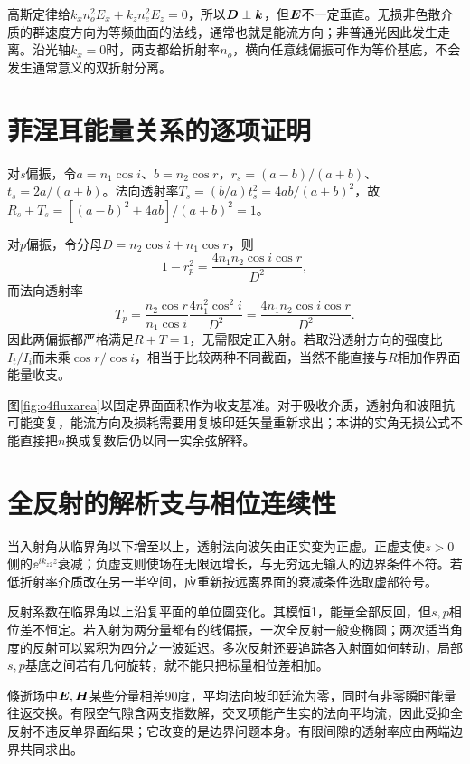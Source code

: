 高斯定律给$k_xn_o^2E_x+k_zn_e^2E_z=0$，所以$\bm{D}\perp\bm{k}$，但$\bm{E}$不一定垂直。无损非色散介质的群速度方向为等频曲面的法线，通常也就是能流方向；非普通光因此发生走离。沿光轴$k_x=0$时，两支都给折射率$n_o$，横向任意线偏振可作为等价基底，不会发生通常意义的双折射分离。

\section{菲涅耳能量关系的逐项证明}
对$s$偏振，令$a=n_1\cos i$、$b=n_2\cos r$，$r_s=(a-b)/(a+b)$、$t_s=2a/(a+b)$。法向透射率$T_s=(b/a)t_s^2=4ab/(a+b)^2$，故$R_s+T_s=[(a-b)^2+4ab]/(a+b)^2=1$。

对$p$偏振，令分母$D=n_2\cos i+n_1\cos r$，则
\[
 1-r_p^2=\frac{4n_1n_2\cos i\cos r}{D^2},
\]
而法向透射率
\[
 T_p=\frac{n_2\cos r}{n_1\cos i}
 \frac{4n_1^2\cos^2i}{D^2}
 =\frac{4n_1n_2\cos i\cos r}{D^2}.
\]
因此两偏振都严格满足$R+T=1$，无需限定正入射。若取沿透射方向的强度比$I_t/I_i$而未乘$\cos r/\cos i$，相当于比较两种不同截面，当然不能直接与$R$相加作界面能量收支。

图\ref{fig:o4fluxarea}以固定界面面积作为收支基准。对于吸收介质，透射角和波阻抗可能变复，能流方向及损耗需要用复坡印廷矢量重新求出；本讲的实角无损公式不能直接把$n$换成复数后仍以同一实余弦解释。

\section{全反射的解析支与相位连续性}
当入射角从临界角以下增至以上，透射法向波矢由正实变为正虚。正虚支使$z>0$侧的$\ee^{ik_{z2}z}$衰减；负虚支则使场在无限远增长，与无穷远无输入的边界条件不符。若低折射率介质改在另一半空间，应重新按远离界面的衰减条件选取虚部符号。

反射系数在临界角以上沿复平面的单位圆变化。其模恒1，能量全部反回，但$s,p$相位差不恒定。若入射为两分量都有的线偏振，一次全反射一般变椭圆；两次适当角度的反射可以累积为四分之一波延迟。多次反射还要追踪各入射面如何转动，局部$s,p$基底之间若有几何旋转，就不能只把标量相位差相加。

倏逝场中$\bm{E},\bm{H}$某些分量相差90度，平均法向坡印廷流为零，同时有非零瞬时能量往返交换。有限空气隙含两支指数解，交叉项能产生实的法向平均流，因此受抑全反射不违反单界面结果；它改变的是边界问题本身。有限间隙的透射率应由两端边界共同求出。

